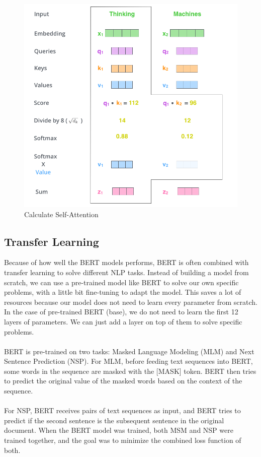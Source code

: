 \documentclass[11pt,a4paper]{article}
\begin{document}
\begin{figure}[!htbp]
	\centering
	\includegraphics[scale=0.3]{figures/self-attention.png}
	\caption{\label{fig:my-label} Calculate Self-Attention \cite{self-attention}}
\end{figure}


\subsection{Transfer Learning}

Because of how well the BERT models performs, BERT is often combined with transfer learning to solve different NLP tasks. Instead of building a model from scratch, we can use a pre-trained model like BERT to solve our own specific problems, with a little bit fine-tuning to adapt the model. This saves a lot of resources because our model does not need to learn every parameter from scratch. In the case of pre-trained BERT (base), we do not need to learn the first 12 layers of parameters. We can just add a layer on top of them to solve specific problems. \\
\\
BERT is pre-trained on two tasks: Masked Language Modeling (MLM) and Next Sentence Prediction (NSP).
For MLM, before feeding text sequences into BERT, some words in the sequence are masked with the [MASK] token. BERT then tries to predict the original value of the masked words based on the context of the sequence.\\
\\
For NSP, BERT receives pairs of text sequences as input, and BERT tries to predict if the second sentence is the subsequent sentence in the original document.
When the BERT model was trained, both MSM and NSP were trained together, and the goal was to minimize the combined loss function of both.\\
\end{document}
